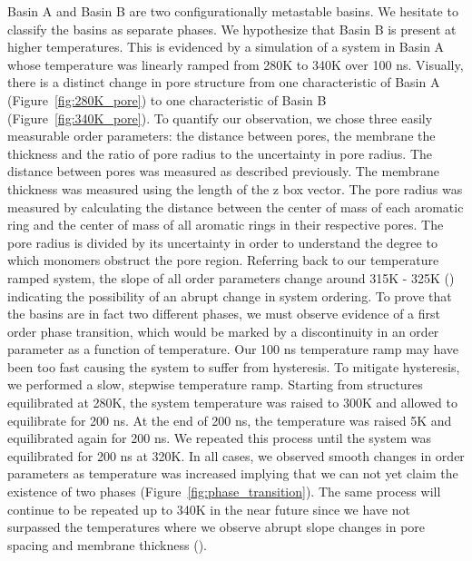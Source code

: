 Basin A and Basin B are two configurationally metastable basins. 
We hesitate to classify the basins as separate phases. We hypothesize
that Basin B is present at higher temperatures. This is evidenced by
a simulation of a system in Basin A whose temperature was linearly
ramped from 280K to 340K over 100 ns. Visually, there is a distinct
change in pore structure from one characteristic of Basin A 
(Figure~\ref{fig:280K_pore}) to one characteristic of Basin B 
(Figure~\ref{fig:340K_pore}). To quantify our observation, we chose 
three easily measurable order parameters: the distance between pores,
the membrane the thickness and the ratio of pore radius to the uncertainty
in pore radius. The distance between pores was measured as described 
previously. The membrane thickness was measured using the length of the
z box vector. The pore radius was measured by calculating the distance
between the center of mass of each aromatic ring and the center of mass
of all aromatic rings in their respective pores. The pore radius is divided by
its uncertainty in order to understand the degree to which monomers 
obstruct the pore region. Referring back to our temperature ramped system,
the slope of all order parameters change around 315K - 325K 
() indicating the 
possibility of an abrupt change in system ordering. To prove that the 
basins are in fact two different phases, we must observe evidence of a
first order phase transition, which would be marked by a discontinuity
in an order parameter as a function of temperature. Our 100 ns temperature
ramp may have been too fast causing the system to suffer from hysteresis. To mitigate
hysteresis, we performed a slow, stepwise temperature ramp. Starting from
structures equilibrated at 280K, the system temperature was raised to 
300K and allowed to equilibrate for 200 ns. At the end of 200 ns, the
temperature was raised 5K and equilibrated again for 200 ns. We repeated
this process until the system was equilibrated for 200 ns at 320K. In all
cases, we observed smooth changes in order parameters as temperature was
increased implying that we can not yet claim the existence of two phases (Figure~\ref{fig:phase_transition}).
The same process will continue to be repeated up to 340K in the near future
since we have not surpassed the temperatures where we observe abrupt slope 
changes in pore spacing and membrane thickness ().

